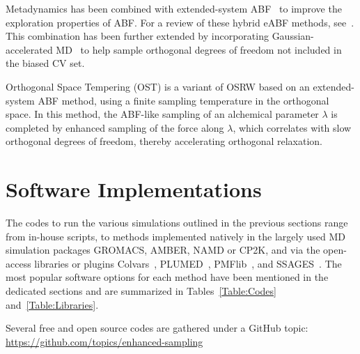 \documentclass[9pt,review]{livecoms}
\begin{document}
Metadynamics has been combined with extended-system ABF~\cite{Fu_MetaD-eABF_JPCL2018,Fu_MetaD-eABF_JCIM2020} to improve the exploration properties of ABF.
For a review of these hybrid eABF methods, see~\cite{Fu2019}.
This combination has been further extended by incorporating Gaussian-accelerated MD~\cite{Chen_GAMD-MetaD-eABF_JCTC2021} to help sample orthogonal degrees of freedom not included in the biased CV set.

Orthogonal Space Tempering (OST) is a variant of OSRW based on an extended-system ABF method, using a finite sampling temperature in the orthogonal space.\cite{Zheng2012}
In this method, the ABF-like sampling of an alchemical parameter $\lambda$ is completed by enhanced sampling of the force along $\lambda$, which correlates with slow orthogonal degrees of freedom, thereby accelerating orthogonal relaxation.

\section{Software Implementations}
The codes to run the various simulations outlined in the previous sections range from in-house scripts, to methods implemented natively in the largely used MD simulation packages GROMACS, AMBER,  NAMD or CP2K, and via the open-access libraries or plugins Colvars~\cite{Fiorin2013}, PLUMED~\cite{Bonomi-CPC-2009,Tribello2014,plumed-nest}, PMFlib~\cite{kulhanek2011pmflib}, and SSAGES~\cite{Sidky2018}. The most popular software options for each method have been mentioned in the dedicated sections and are summarized in Tables~\ref{Table:Codes} and~\ref{Table:Libraries}.

Several free and open source codes are gathered under a GitHub topic: \url{https://github.com/topics/enhanced-sampling}
\end{document}

